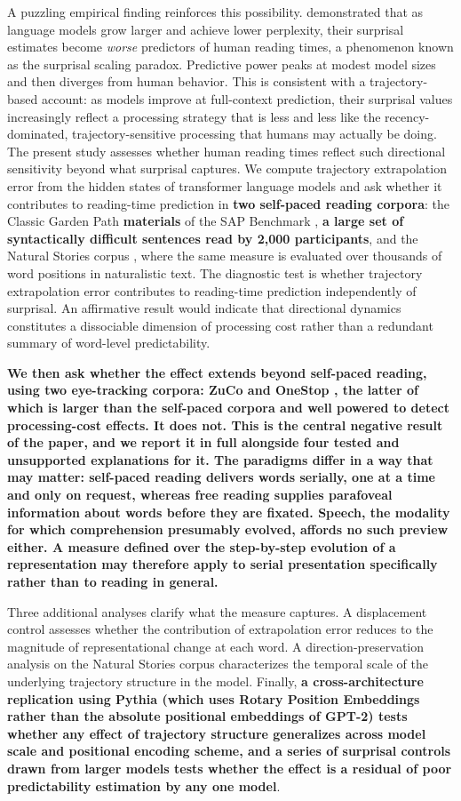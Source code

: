 \documentclass[12pt]{article}
\newcommand{\new}[1]{{\bfseries #1}}
\begin{document}
A puzzling empirical finding reinforces this possibility. \citet{oh2023b} demonstrated that as language models grow larger and achieve lower perplexity, their surprisal estimates become \textit{worse} predictors of human reading times, a phenomenon known as the surprisal scaling paradox. Predictive power peaks at modest model sizes and then diverges from human behavior. This is consistent with a trajectory-based account: as models improve at full-context prediction, their surprisal values increasingly reflect a processing strategy that is less and less like the recency-dominated, trajectory-sensitive processing that humans may actually be doing.
The present study assesses whether human reading times reflect such directional sensitivity beyond what surprisal captures. We compute trajectory extrapolation error from the hidden states of transformer language models and ask whether it contributes to reading-time prediction in \new{two self-paced reading corpora}: the Classic Garden Path \new{materials} of the SAP Benchmark \citep{huang2024}, \new{a large set of syntactically difficult sentences read by 2,000 participants}, and the Natural Stories corpus \citep{futrell2018}, where the same measure is evaluated over thousands of word positions in naturalistic text. The diagnostic test is whether trajectory extrapolation error contributes to reading-time prediction independently of surprisal. An affirmative result would indicate that directional dynamics constitutes a dissociable dimension of processing cost rather than a redundant summary of word-level predictability.

\new{We then ask whether the effect extends beyond self-paced reading, using two eye-tracking corpora: ZuCo \citep{hollenstein2018} and OneStop \citep{berzak2025}, the latter of which is larger than the self-paced corpora and well powered to detect processing-cost effects. It does not. This is the central negative result of the paper, and we report it in full alongside four tested and unsupported explanations for it. The paradigms differ in a way that may matter: self-paced reading delivers words serially, one at a time and only on request, whereas free reading supplies parafoveal information about words before they are fixated. Speech, the modality for which comprehension presumably evolved, affords no such preview either. A measure defined over the step-by-step evolution of a representation may therefore apply to serial presentation specifically rather than to reading in general.}

Three additional analyses clarify what the measure captures. A displacement control assesses whether the contribution of extrapolation error reduces to the magnitude of representational change at each word. A direction-preservation analysis on the Natural Stories corpus characterizes the temporal scale of the underlying trajectory structure in the model. Finally, \new{a cross-architecture replication using Pythia (which uses Rotary Position Embeddings rather than the absolute positional embeddings of GPT-2) tests whether any effect of trajectory structure generalizes across model scale and positional encoding scheme, and a series of surprisal controls drawn from larger models tests whether the effect is a residual of poor predictability estimation by any one model}.
\end{document}
